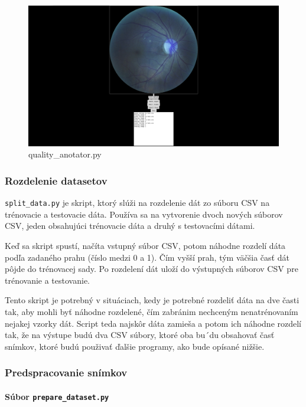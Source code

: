 \documentclass[a4paper, 11pt]{article}
\begin{document}
\begin{figure}
    \centering
    \includegraphics[width=1\linewidth]{images/gui.png}
    \caption{quality\_anotator.py}
    \label{fig:gui-label}
\end{figure}

\subsubsection{Rozdelenie datasetov}

 \texttt{split\_data.py} je skript, ktorý slúži na rozdelenie dát zo súboru CSV na trénovacie a testovacie dáta. Používa sa na vytvorenie dvoch nových súborov CSV, jeden obsahujúci trénovacie dáta a druhý s testovacími dátami.

Keď sa skript spustí, načíta vstupný súbor CSV, potom náhodne rozdelí dáta podľa zadaného prahu (číslo medzi 0 a 1). Čím vyšší prah, tým väčšia časť dát pôjde do trénovacej sady. Po rozdelení dát uloží do výstupných súborov CSV pre trénovanie a testovanie.

Tento skript je potrebný v situáciach, kedy je potrebné rozdeliť dáta na dve časti tak, aby mohli byť náhodne rozdelené, čím zabránim nechceným nenatrénovaním nejakej vzorky dát. Script teda najskôr dáta zamieša a potom ich náhodne rozdelí tak, že na výstupe budú dva CSV súbory, ktoré oba bu´du obsahovať časť snímkov, ktoré budú použivať ďalšie programy, ako bude opísané nižšie.

\subsubsection{Predspracovanie snímkov}
\label{preprocess}

\paragraph{Súbor \texttt{prepare\_dataset.py}
}
\end{document}
